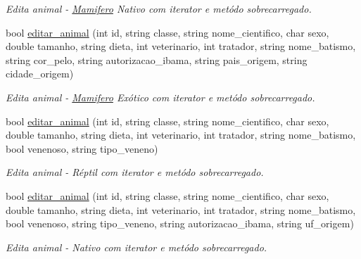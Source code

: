 \begin{DoxyCompactItemize}
\begin{DoxyCompactList}\small\item\em Edita animal -\/ \mbox{\hyperlink{class_mamifero}{Mamifero}} Nativo com iterator e metódo sobrecarregado. \end{DoxyCompactList}\item 
\mbox{\label{class_sistema_a0ce3cca9d8d81d4a761237c269f98209}} 
bool \mbox{\hyperlink{class_sistema_a0ce3cca9d8d81d4a761237c269f98209}{editar\+\_\+animal}} (int id, string classe, string nome\+\_\+cientifico, char sexo, double tamanho, string dieta, int veterinario, int tratador, string nome\+\_\+batismo, string cor\+\_\+pelo, string autorizacao\+\_\+ibama, string pais\+\_\+origem, string cidade\+\_\+origem)
\begin{DoxyCompactList}\small\item\em Edita animal -\/ \mbox{\hyperlink{class_mamifero}{Mamifero}} Exótico com iterator e metódo sobrecarregado. \end{DoxyCompactList}\item 
\mbox{\label{class_sistema_a90baa50637c286863a2035817f0f9bce}} 
bool \mbox{\hyperlink{class_sistema_a90baa50637c286863a2035817f0f9bce}{editar\+\_\+animal}} (int id, string classe, string nome\+\_\+cientifico, char sexo, double tamanho, string dieta, int veterinario, int tratador, string nome\+\_\+batismo, bool venenoso, string tipo\+\_\+veneno)
\begin{DoxyCompactList}\small\item\em Edita animal -\/ Réptil com iterator e metódo sobrecarregado. \end{DoxyCompactList}\item 
\mbox{\label{class_sistema_aa746b33d6287272f40f49b0bec215c03}} 
bool \mbox{\hyperlink{class_sistema_aa746b33d6287272f40f49b0bec215c03}{editar\+\_\+animal}} (int id, string classe, string nome\+\_\+cientifico, char sexo, double tamanho, string dieta, int veterinario, int tratador, string nome\+\_\+batismo, bool venenoso, string tipo\+\_\+veneno, string autorizacao\+\_\+ibama, string uf\+\_\+origem)
\begin{DoxyCompactList}\small\item\em Edita animal -\/ Nativo com iterator e metódo sobrecarregado. \end{DoxyCompactList}\item 
\mbox{\label{class_sistema_a62bed38c08140063ae833bffa9f7d422}} 

\end{DoxyCompactItemize}
